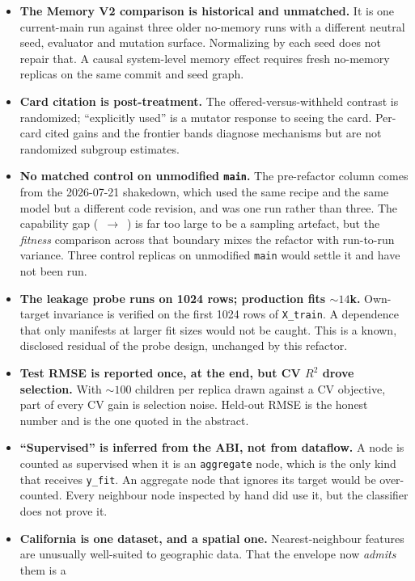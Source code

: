 \documentclass[11pt]{article}
\begin{document}
\begin{itemize}
\item \textbf{The Memory V2 comparison is historical and unmatched.} It is one current-main
run against three older no-memory runs with a different neutral seed, evaluator and mutation
surface. Normalizing by each seed does not repair that. A causal system-level memory effect
requires fresh no-memory replicas on the same commit and seed graph.
\item \textbf{Card citation is post-treatment.} The offered-versus-withheld contrast is
randomized; ``explicitly used'' is a mutator response to seeing the card. Per-card cited
gains and the frontier bands diagnose mechanisms but are not randomized subgroup estimates.
\item \textbf{No matched control on unmodified \texttt{main}.} The pre-refactor column comes
from the 2026-07-21 shakedown, which used the same recipe and the same model but a different
code revision, and was one run rather than three. The capability gap
(\priorNbrBuilt{}~$\to$~\allNbrBuilt{}) is far too large to be a sampling artefact, but the
\emph{fitness} comparison across that boundary mixes the refactor with run-to-run variance.
Three control replicas on unmodified \texttt{main} would settle it and have not been run.
\item \textbf{The leakage probe runs on 1024 rows; production fits ${\sim}14$k.} Own-target
invariance is verified on the first 1024 rows of \texttt{X\_train}. A dependence that only
manifests at larger fit sizes would not be caught. This is a known, disclosed residual of the
probe design, unchanged by this refactor.
\item \textbf{Test RMSE is reported once, at the end, but CV $R^2$ drove selection.} With
${\sim}100$ children per replica drawn against a CV objective, part of every CV gain is
selection noise. Held-out RMSE is the honest number and is the one quoted in the abstract.
\item \textbf{``Supervised'' is inferred from the ABI, not from dataflow.} A node is counted
as supervised when it is an \texttt{aggregate} node, which is the only kind that receives
\texttt{y\_fit}. An aggregate node that ignores its target would be over-counted. Every
neighbour node inspected by hand did use it, but the classifier does not prove it.
\item \textbf{California is one dataset, and a spatial one.} Nearest-neighbour features are
unusually well-suited to geographic data. That the envelope now \emph{admits} them is a

\end{itemize}
\end{document}
